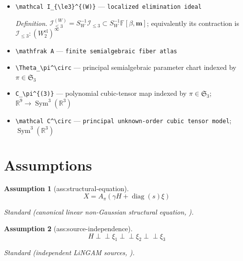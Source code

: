 \documentclass{article}
\newtheorem{assumption}{Assumption}
\begin{document}
\begin{itemize}
  \item \texttt{\textbackslash{}\allowbreak{}mathcal I\_\allowbreak{}\{\textbackslash{}\allowbreak{}le3\}\allowbreak{}\textasciicircum{}\{(W)\}\allowbreak{}} --- \texttt{localized elimination ideal}
  \par\smallskip\noindent\emph{Definition.} \(\mathcal I_{\le3}^{(W)}=S_W^{-1}\mathcal I_{\le3}\subset S_W^{-1}\mathbb F[\beta,\mathbf m]\); equivalently its contraction is \(\mathcal I_{\le3}:(W_2^{\mathrm{el}})^\infty\)
  \item \texttt{\textbackslash{}\allowbreak{}mathfrak A} --- \texttt{finite semialgebraic fiber atlas}
  \item \texttt{\textbackslash{}\allowbreak{}Theta\_\allowbreak{}\textbackslash{}\allowbreak{}pi\textasciicircum{}\textbackslash{}\allowbreak{}circ} --- principal semialgebraic parameter chart indexed by \(\pi\in\mathfrak S_3\)
  \item \texttt{C\_\allowbreak{}\textbackslash{}\allowbreak{}pi\textasciicircum{}\{(3)\}\allowbreak{}} --- polynomial cubic-tensor map indexed by \(\pi\in\mathfrak S_3\); \(\mathbb R^9\to\operatorname{Sym}^3(\mathbb R^3)\)
  \item \texttt{\textbackslash{}\allowbreak{}mathcal C\textasciicircum{}\textbackslash{}\allowbreak{}circ} --- \texttt{principal unknown-\allowbreak{}order cubic tensor model}; \(\operatorname{Sym}^3(\mathbb R^3)\)
\end{itemize}

\section{Assumptions}

\begin{assumption}[ass:structural-equation]\label{ass:structural-equation}
\[X=A_\pi(\gamma H+\operatorname{diag}(s)\xi)\]
\par\smallskip\noindent\emph{Standard} (canonical linear non-Gaussian structural equation, \cite{tramontanoEtAl2025HigherOrderCumulants}).
\end{assumption}

\begin{assumption}[ass:source-independence]\label{ass:source-independence}
\[H\mathrel{\perp\!\!\!\perp}\xi_1\mathrel{\perp\!\!\!\perp}\xi_2\mathrel{\perp\!\!\!\perp}\xi_3\]
\par\smallskip\noindent\emph{Standard} (independent LiNGAM sources, \cite{shimizuEtAl2006LiNGAM}).
\end{assumption}
\end{document}
